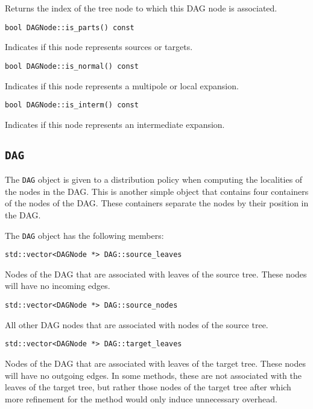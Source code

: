 \noindent Returns the index of the tree node to which this DAG node is
associated.

\begin{lstlisting}
bool DAGNode::is_parts() const
\end{lstlisting}

\noindent Indicates if this node represents sources or targets.

\begin{lstlisting}
bool DAGNode::is_normal() const
\end{lstlisting}

\noindent Indicates if this node represents a multipole or local expansion.

\begin{lstlisting}
bool DAGNode::is_interm() const
\end{lstlisting}

\noindent Indicates if this node represents an intermediate expansion.


\subsection{\texttt{DAG}}

The \texttt{DAG} object is given to a distribution policy when computing the
localities of the nodes in the DAG. This is another simple object that contains
four containers of the nodes of the DAG. These containers separate the nodes
by their position in the DAG.

The \texttt{DAG} object has the following members:

\begin{lstlisting}
std::vector<DAGNode *> DAG::source_leaves
\end{lstlisting}

\noindent Nodes of the DAG that are associated with leaves of the source tree.
These nodes will have no incoming edges.

\begin{lstlisting}
std::vector<DAGNode *> DAG::source_nodes
\end{lstlisting}

\noindent All other DAG nodes that are associated with nodes of the source tree.

\begin{lstlisting}
std::vector<DAGNode *> DAG::target_leaves
\end{lstlisting}

\noindent Nodes of the DAG that are associated with leaves of the target tree.
These nodes will have no outgoing edges. In some methods, these are not
associated with the leaves of the target tree, but rather those nodes of the
target tree after which more refinement for the method would only induce
unnecessary overhead.

